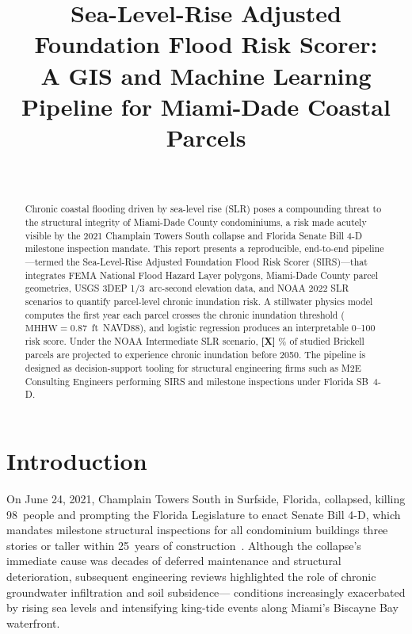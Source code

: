 \documentclass[conference]{IEEEtran}
\title{Sea-Level-Rise Adjusted Foundation Flood Risk Scorer:\\
A GIS and Machine Learning Pipeline for Miami-Dade Coastal Parcels}
\author{%
  \IEEEauthorblockN{\placeholder{Student Name}}\\
  \IEEEauthorblockA{Department of Mechanical Engineering and Applied Mechanics\\
    University of Pennsylvania\\
    MEAM 4600 — AI for Science and Engineering\\
    \placeholder{email@seas.upenn.edu}}
}
\newcommand{\placeholder}[1]{%
  \colorbox{yellow!60}{\textbf{[#1]}}%
}
\begin{document}
\maketitle

\begin{abstract}
Chronic coastal flooding driven by sea-level rise (SLR) poses a
compounding threat to the structural integrity of Miami-Dade County
condominiums, a risk made acutely visible by the 2021 Champlain Towers
South collapse and Florida Senate Bill 4-D milestone inspection mandate.
This report presents a reproducible, end-to-end pipeline—termed the
Sea-Level-Rise Adjusted Foundation Flood Risk Scorer (SIRS)—that
integrates FEMA National Flood Hazard Layer polygons, Miami-Dade County
parcel geometries, USGS 3DEP 1/3~arc-second elevation data, and NOAA
2022 SLR scenarios to quantify parcel-level chronic inundation risk.
A stillwater physics model computes the first year each parcel crosses
the chronic inundation threshold ($\text{MHHW} = 0.87$~ft~NAVD88), and
logistic regression produces an interpretable 0--100 risk score.
Under the NOAA Intermediate SLR scenario,
\placeholder{X}\% of studied Brickell parcels are projected to experience
chronic inundation before 2050.
The pipeline is designed as decision-support tooling for structural
engineering firms such as M2E Consulting Engineers performing SIRS
and milestone inspections under Florida SB~4-D.
\end{abstract}


\section{Introduction}

On June 24, 2021, Champlain Towers South in Surfside, Florida,
collapsed, killing 98~people and prompting the Florida Legislature to
enact Senate Bill 4-D, which mandates milestone structural inspections
for all condominium buildings three stories or taller within 25~years
of construction~\cite{floridaSB4D}.
Although the collapse's immediate cause was decades of deferred maintenance
and structural deterioration, subsequent engineering reviews highlighted
the role of chronic groundwater infiltration and soil subsidence—
conditions increasingly exacerbated by rising sea levels and intensifying
king-tide events along Miami's Biscayne Bay waterfront.
\end{document}
